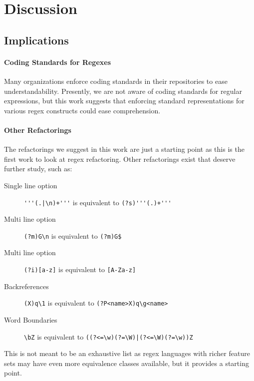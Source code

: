 \section{Discussion}
\label{sec:discussion}

\subsection{Implications}

\paragraph{Coding Standards for Regexes}
Many organizations enforce coding standards in their repositories to ease understandability. 
Presently, we are not aware of coding standards for regular expressions, but this work suggests that enforcing standard representations for various regex constructs could ease comprehension. 


\paragraph{Other Refactorings}
The refactorings we suggest in this work are just a starting point as this is the first work to look 
at regex refactoring. 
Other refactorings exist that deserve further study, such as: 
\begin{description}
\item[Single line option]  \verb!'''(.|\n)+'''! is equivalent to \verb!(?s)'''(.)+'''!
\item[Multi line option]  \verb!(?m)G\n! is equivalent to \verb!(?m)G$!
\item[Multi line option]  \verb!(?i)[a-z]! is equivalent to \verb![A-Za-z]!
\item[Backreferences]  \verb!(X)q\1! is equivalent to \verb!(?P<name>X)q\g<name>!
\item[Word Boundaries]  \verb!\bZ! is equivalent to \verb!((?<=\w)(?=\W)|(?<=\W)(?=\w))Z!
\end{description}

\noindent This is not meant to be an exhaustive list as regex languages with richer feature sets may have even more equivalence classes available, but it provides a starting point. 

